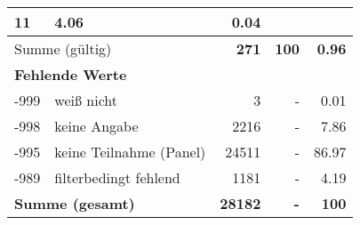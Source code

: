\begin{longtable}{lXrrr}
       \num{11} &
       \num[round-mode=places,round-precision=2]{4.06} &
         \num[round-mode=places,round-precision=2]{0.04} \\
     \midrule
     \multicolumn{2}{l}{Summe (gültig)} &
       \textbf{\num{271}} &
     \textbf{100} &
       \textbf{\num[round-mode=places,round-precision=2]{0.96}} \\
     \multicolumn{5}{l}{\textbf{Fehlende Werte}}\\
       -999 &
       weiß nicht &
         \num{3} &
        - &
         \num[round-mode=places,round-precision=2]{0.01} \\
       -998 &
       keine Angabe &
         \num{2216} &
        - &
         \num[round-mode=places,round-precision=2]{7.86} \\
       -995 &
       keine Teilnahme (Panel) &
         \num{24511} &
        - &
         \num[round-mode=places,round-precision=2]{86.97} \\
       -989 &
       filterbedingt fehlend &
         \num{1181} &
        - &
         \num[round-mode=places,round-precision=2]{4.19} \\
     \midrule
     \multicolumn{2}{l}{\textbf{Summe (gesamt)}} &
          \textbf{\num{28182}} &
        \textbf{-} &
        \textbf{100} \\
     \bottomrule
     \end{longtable}
     
